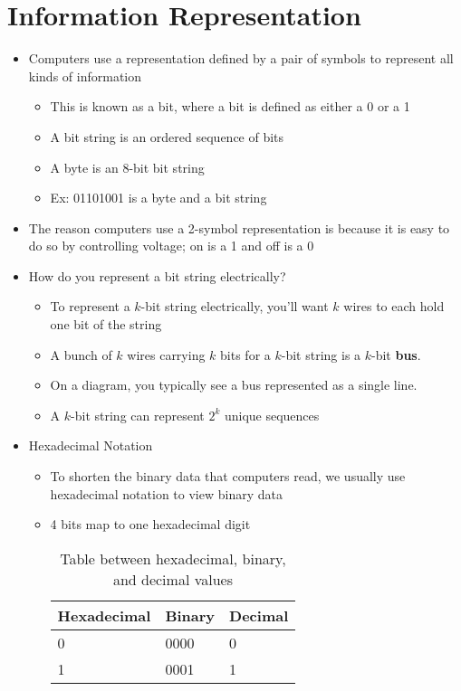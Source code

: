\documentclass{article}
\begin{document}
\section{Information Representation}
\begin{itemize}
	\item Computers use a representation defined by a pair of symbols to represent all kinds of information
		\begin{itemize}
			\item This is known as a bit, where a bit is defined as either a 0 or a 1
			\item A bit string is an ordered sequence of bits
			\item A byte is an 8-bit bit string
			\item Ex: 01101001 is a byte and a bit string
		\end{itemize}
	\item The reason computers use a 2-symbol representation is because it is easy to do so by controlling voltage; on is a 1 and off is a 0
	\item How do you represent a bit string electrically?
		\begin{itemize}
			\item To represent a $k$-bit string electrically, you'll want $k$ wires to each hold one bit of the string
			\item A bunch of $k$ wires carrying $k$ bits for a $k$-bit string is a $k$-bit \textbf{bus}.
			\item On a diagram, you typically see a bus represented as a single line.
			\item A $k$-bit string can represent $2^k$ unique sequences
		\end{itemize}
	\item Hexadecimal Notation
		\begin{itemize}
			\item To shorten the binary data that computers read, we usually use hexadecimal notation to view binary data
			\item 4 bits map to one hexadecimal digit
				\begin{table}
					\caption{Table between hexadecimal, binary, and decimal values}
					\begin{center}
						\begin{tabular}[h]{l l l}
							Hexadecimal & Binary & Decimal \\
							\hline
							0 & 0000 & 0 \\
							1 & 0001 & 1 \\

\end{tabular}
\end{center}
\end{table}
\end{itemize}
\end{itemize}
\end{document}

